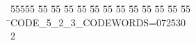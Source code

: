 %
%
\begin{tabbing}
55555 \= 55 \= 55 \= 55 \= 55 \= 55 \= 55 \= 55 \= 55 \= 55 \= 55 \= 55 \= 55 \= \>CODE\_5\_2\_3\_CODEWORDS=072530\\[0pt]
2\>\end{tabbing}
